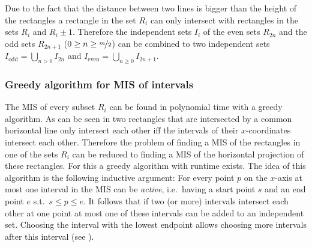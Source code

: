 Due to the fact that the distance between two lines is bigger than the height of the rectangles a rectangle in the set $R_i$ can only intersect with rectangles in the sets $R_i$ and $R_i\pm1$. Therefore the independent sets $I_i$ of the even sets $R_{2n}$ and the odd sets $R_{2n+1}$ ($0\geq n \geq \nicefrac{m}{2}$) can be combined to two independent sets $I_{\text{odd}} = \bigcup_{n> 0} I_{2n}$ and $I_{\text{even}} = \bigcup_{n\geq 0} I_{2n+1}$.

\subsubsection{Greedy algorithm for MIS of intervals}\label{sec:greedyalg}
The MIS of every subset $R_i$ can be found in polynomial time with a greedy algorithm. As can be seen in  two rectangles that are intersected by a common horizontal line only intersect each other iff the intervals of their $x$-coordinates intersect each other. Therefore the problem of finding a MIS of the rectangles in one of the sets $R_i$ can be reduced to finding a MIS of the horizontal projection of these rectangles. For this a greedy algorithm with runtime  exists. The idea of this algorithm is the following inductive argument: For every point $p$ on the $x$-axis at most one interval in the MIS can be \textit{active}, i.e.\ having a start point $s$ and an end point $e$ s.t.\ $s\leq p\leq e$. It follows that if two (or more) intervals intersect each other at one point at most one of these intervals can be added to an independent set. Choosing the interval with the lowest endpoint allows choosing more intervals after this interval (see ). 

